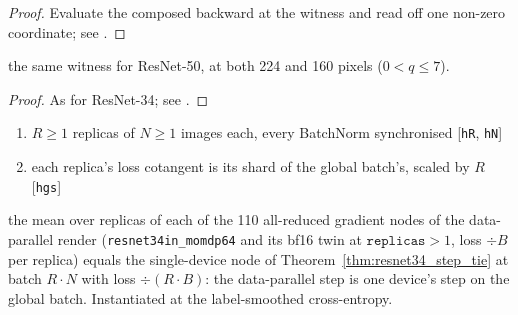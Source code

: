 \begin{proof}
\leanok
Evaluate the composed backward at the witness and read off one non-zero
coordinate; see .
\end{proof}

\begin{theorem}
  \label{thm:resnet50_seal}
  \leanok
  \Prove{} the same witness for ResNet-50, at both 224 and 160 pixels
  (\(0 < q \le 7\)).
\end{theorem}

\begin{proof}
\leanok
As for ResNet-34; see .
\end{proof}

\begin{theorem}
  \label{thm:resnet34_sync_tie}
  \leanok
  \Assume{}
  \begin{enumerate}
    \item \(R \ge 1\) replicas of \(N \ge 1\) images each, every BatchNorm
          synchronised \hfill[\texttt{hR}, \texttt{hN}]
    \item each replica's loss cotangent is its shard of the global batch's,
          scaled by \(R\) \hfill[\texttt{hgs}]
  \end{enumerate}
  \Prove{} the mean over replicas of each of the 110 all-reduced gradient
  nodes of the data-parallel render (\texttt{resnet34in\_momdp64} and its
  bf16 twin at \(\texttt{replicas} > 1\), loss \(\div B\) per replica) equals the
  single-device node of Theorem~\ref{thm:resnet34_step_tie} at batch
  \(R \cdot N\) with loss \(\div (R \cdot B)\): the data-parallel step is one
  device's step on the global batch. Instantiated at the label-smoothed
  cross-entropy.
\end{theorem}

